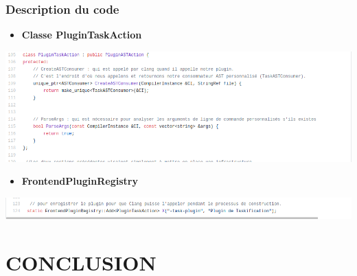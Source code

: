 \documentclass[hyperref={bookmarks=false},aspectratio=169]{beamer}
\begin{document}
\begin{frame}
\frametitle{Description du code}
\begin{itemize}
  \item \textbf{Classe PluginTaskAction}
\end{itemize}

\vfill
\begin{center} \includegraphics[scale=0.3]{./figures/class3.png}  \end{center}
\begin{itemize}
  \item \textbf{FrontendPluginRegistry}
\end{itemize}
\begin{center} \includegraphics[scale=0.3]{./figures/class4.png} \end{center}
\vfill




\end{frame}



\section{CONCLUSION}
\end{document}
